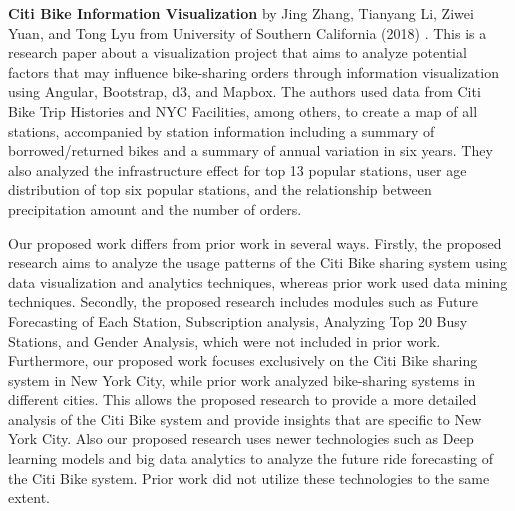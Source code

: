 \documentclass[journal]{vgtc}                     %
\begin{document}
\textbf{Citi Bike Information Visualization} by Jing Zhang, Tianyang Li, Ziwei Yuan, and Tong Lyu from University of Southern California (2018) \cite{11}. This is a research paper about a visualization project that aims to analyze potential factors that may influence bike-sharing orders through information visualization using Angular, Bootstrap, d3, and Mapbox. The authors used data from Citi Bike Trip Histories and NYC Facilities, among others, to create a map of all stations, accompanied by station information including a summary of borrowed/returned bikes and a summary of annual variation in six years. They also analyzed the infrastructure effect for top 13 popular stations, user age distribution of top six popular stations, and the relationship between precipitation amount and the number of orders.

Our proposed work differs from prior work in several ways. Firstly, the proposed research aims to analyze the usage patterns of the Citi Bike sharing system using data visualization and analytics techniques, whereas prior work used data mining techniques. Secondly, the proposed research includes modules such as Future Forecasting of Each Station, Subscription analysis, Analyzing Top 20 Busy Stations, and Gender Analysis, which were not included in prior work. Furthermore, our proposed work focuses exclusively on the Citi Bike sharing system in New York City, while prior work analyzed bike-sharing systems in different cities. This allows the proposed research to provide a more detailed analysis of the Citi Bike system and provide insights that are specific to New York City. Also our proposed research uses newer technologies such as Deep learning models and big data analytics to analyze the future ride forecasting of the Citi Bike system. Prior work did not utilize these technologies to the same extent.
\end{document}
